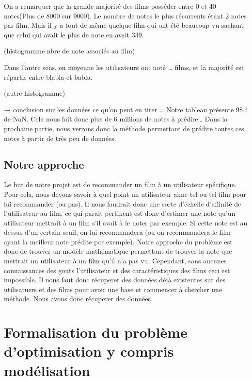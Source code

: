 \documentclass[a4paper,10pt]{article}
\begin{document}
On a remarquer que la grande majorité des films posséder entre 0 et 40 notes(Plus de 8000 sur 9000). 
Le nombre de notes le plus récurrents étant 2 notes par film. Mais il y a tout de même quelque film qui ont été
beaucoup vu sachant que celui qui avait le plus de note en avait 339.

(histogramme nbre de note associés au film)

Dans l’autre sens, en moyenne les utilisateurs ont noté … films, et la majorité est répartis entre blabla et babla.

(autre histogramme)

→ conclusion sur les données ce qu’on peut en tirer …
Notre tableau présente 98,4 \pourcent de NaN. Cela nous fait donc plus de 6 millions de notes à prédire… Dans la prochaine partie,
nous verrons donc la méthode permettant de prédire toutes ces notes à partir de très peu de données.

\subsection{Notre approche}
Le but de notre projet est de recommander un film à un utilisateur spécifique.  
Pour cela, nous devons savoir à quel point un utilisateur aime tel ou tel film pour lui recommander (ou pas).  
Il nous faudrait donc une sorte d'échelle d'affinité de l'utilisateur au film, ce qui parait pertinent est donc d'estimer une note qu'un utilisateur mettrait à un film s'il avait à le noter par exemple.  
Si cette note est au dessus d'un certain seuil, on lui recommandera (ou on recommandera le film ayant la meilleur note prédite par exemple).  
Notre approche du problème est donc de trouver un modèle mathématique permettant de trouver la note que mettrait un utilisateur à un film qu'il n'a pas vu.  
Cependant, sans aucunes connaissances des gouts l'utilisateur et des caractéristiques des films ceci est impossible. Il nous faut donc récuperer des données déjà existentes sur des utilisatuers et des films pour avoir une base et commencer à chercher une méthode.   
Nous avons donc récuperer des données.

\subsection{}
\section{Formalisation du problème d'optimisation y compris modélisation}
\end{document}
